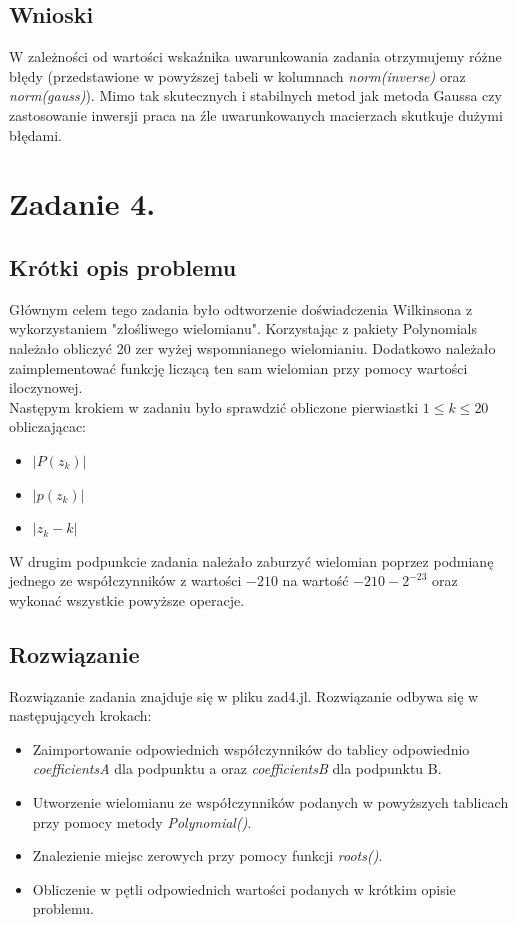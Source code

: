 \documentclass[a4paper,14pt]{report}
\begin{document}
  \section{Wnioski}
    W zależności od wartości wskaźnika uwarunkowania zadania otrzymujemy różne błędy (przedstawione w powyższej tabeli w kolumnach \textit{norm(inverse)} oraz \textit{norm(gauss)}). Mimo tak skutecznych i stabilnych metod jak metoda Gaussa czy zastosowanie inwersji praca na źle uwarunkowanych macierzach skutkuje dużymi błędami.

\chapter{Zadanie 4.}
  \section{Krótki opis problemu}
    Głównym celem tego zadania było odtworzenie doświadczenia Wilkinsona z wykorzystaniem "złośliwego wielomianu". Korzystając z pakiety Polynomials należało obliczyć 20 zer wyżej wspomnianego wielomianiu. Dodatkowo należało zaimplementować funkcję liczącą ten sam wielomian przy pomocy wartości iloczynowej. \\
    Następym krokiem w zadaniu było sprawdzić obliczone pierwiastki $1 \leq k \leq 20 $ obliczającac:
    \begin{itemize}
      \item $ |P(z_{k})| $
      \item $ |p(z_{k})|$
      \item $ |z_{k}-k|$
    \end{itemize}
    W drugim podpunkcie zadania należało zaburzyć wielomian poprzez podmianę jednego ze współczynników z wartości $-210$ na wartość $-210-2^{-23}$ oraz wykonać wszystkie powyższe operacje.
  \section{Rozwiązanie}
    Rozwiązanie zadania znajduje się w pliku zad4.jl. Rozwiązanie odbywa się w następujących krokach:
    \begin{itemize}
      \item Zaimportowanie odpowiednich współczynników do tablicy odpowiednio \textit{coefficientsA} dla podpunktu a oraz \textit{coefficientsB} dla podpunktu B.
      \item Utworzenie wielomianu ze współczynników podanych w powyższych tablicach przy pomocy metody \textit{Polynomial()}.
      \item Znalezienie miejsc zerowych przy pomocy funkcji \textit{roots()}.
      \item Obliczenie w pętli odpowiednich wartości podanych w krótkim opisie problemu.
    \end{itemize}
\end{document}

